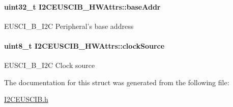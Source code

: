 \paragraph[{base\-Addr}]{\setlength{\rightskip}{0pt plus 5cm}uint32\-\_\-t I2\-C\-E\-U\-S\-C\-I\-B\-\_\-\-H\-W\-Attrs\-::base\-Addr}\label{struct_i2_c_e_u_s_c_i_b___h_w_attrs_ac629f3dec6ed52e4f6696c301000c0ac}
E\-U\-S\-C\-I\-\_\-\-B\-\_\-\-I2\-C Peripheral's base address 
\paragraph[{clock\-Source}]{\setlength{\rightskip}{0pt plus 5cm}uint8\-\_\-t I2\-C\-E\-U\-S\-C\-I\-B\-\_\-\-H\-W\-Attrs\-::clock\-Source}\label{struct_i2_c_e_u_s_c_i_b___h_w_attrs_ae90808e5895254b06d72a2c83f4f0987}
E\-U\-S\-C\-I\-\_\-\-B\-\_\-\-I2\-C Clock source 

The documentation for this struct was generated from the following file\-:\begin{DoxyCompactItemize}
\item 
\hyperlink{_i2_c_e_u_s_c_i_b_8h}{I2\-C\-E\-U\-S\-C\-I\-B.\-h}\end{DoxyCompactItemize}
